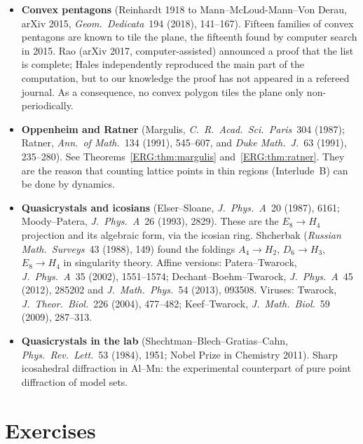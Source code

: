 \begin{itemize}[leftmargin=1.2em,itemsep=0.45em]
  Tao (\emph{Ann.\ of Math.}~200 (2024), 301--363) found a counterexample in sufficiently high dimension,
  encoding a ``Sudoku'' by a single tiling equation. So translational tilings by one tile can be forced to
  be aperiodic.
\item \textbf{Convex pentagons} (Reinhardt 1918 to Mann--McLoud-Mann--Von Derau, arXiv 2015,
  \emph{Geom.\ Dedicata}~194 (2018), 141--167). Fifteen families of
  convex pentagons are known to tile the plane, the fifteenth found by computer search in 2015. Rao (arXiv
  2017, computer-assisted) announced a proof that the list is complete; Hales independently reproduced
  the main part of the computation, but to our knowledge the proof has not appeared in a refereed journal. As a consequence, no convex polygon
  tiles the plane only non-periodically.
\item \textbf{Oppenheim and Ratner} (Margulis, \emph{C.\ R.\ Acad.\ Sci.\ Paris}~304 (1987); Ratner,
  \emph{Ann.\ of Math.}~134 (1991), 545--607, and \emph{Duke Math.\ J.}~63 (1991), 235--280). See
  Theorems~\ref{ERG:thm:margulis} and~\ref{ERG:thm:ratner}. They are the reason that counting lattice
  points in thin regions (Interlude~B) can be done by dynamics.
\item \textbf{Quasicrystals and icosians} (Elser--Sloane, \emph{J.\ Phys.\ A}~20 (1987), 6161; Moody--Patera,
  \emph{J.\ Phys.\ A}~26 (1993), 2829). These are the $E_8\to H_4$ projection and its algebraic form, via the
  icosian ring. Shcherbak (\emph{Russian Math.\ Surveys}~43 (1988), 149) found the foldings
  $A_4\to H_2$, $D_6\to H_3$, $E_8\to H_4$ in singularity theory. Affine versions: Patera--Twarock,
  \emph{J.\ Phys.\ A}~35 (2002), 1551--1574; Dechant--Boehm--Twarock, \emph{J.\ Phys.\ A}~45 (2012), 285202
  and \emph{J.\ Math.\ Phys.}~54 (2013), 093508. Viruses: Twarock, \emph{J.\ Theor.\ Biol.}~226 (2004),
  477--482; Keef--Twarock, \emph{J.\ Math.\ Biol.}~59 (2009), 287--313.
\item \textbf{Quasicrystals in the lab} (Shechtman--Blech--Gratias--Cahn, \emph{Phys.\ Rev.\ Lett.}~53 (1984),
  1951; Nobel Prize in Chemistry 2011). Sharp icosahedral diffraction in Al--Mn: the experimental
  counterpart of pure point diffraction of model sets.
\end{itemize}

\section*{Exercises}

